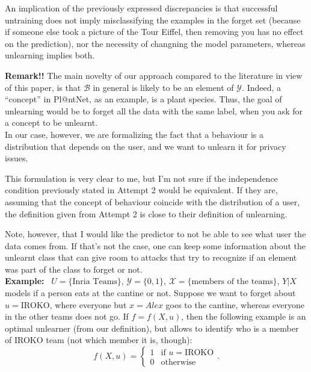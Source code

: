 An implication of the previously expressed discrepancies is that successful untraining does not imply misclassifying the examples in the forget set (be\-cause if someone else took a picture of the Tour Eiffel, then removing you has no effect on the prediction), nor the necessity of changning the model parameters, whereas unlearning implies both.

{\color{RoyalBlue}
\textbf{Remark!!} The main novelty of our approach compared to the literature in view of this paper, is that $\mathcal{B}$ in general is likely to be an element of $\mathcal{Y}$.
Indeed, a ``concept'' in Pl@ntNet, as an example, is a plant species. Thus, the goal of unlearning would be to forget all the data with the same label, when you ask for a concept to be unlearnt.\\
In our case, however, we are formalizing the fact that a behaviour is a distribution that depends on the user, and we want to unlearn it for privacy issues.
\vspace{0.2cm}

\noindent
This formulation is very clear to me, but I'm not sure if the independence condition previously stated in Attempt 2 would be equivalent.
If they are, assuming that the concept of behaviour coincide with the distribution of a user, the definition given from Attempt 2 is close to their definition of un\-learning.

Note, however, that I would like the predictor to not be able to see what user the data comes from. 
If that's not the case, one can keep some information about the unlearnt class that can give room to attacks that try to recognize if an element was part of the class to forget or not.\\
\textbf{Example:}~ $U=\{\text{Inria Teams}\}$, $\mathcal{Y}=\{0,1\}$, $\mathcal{X}=\{\text{members of the teams}\}$, $Y|X$ models if a person eats at the cantine or not.
Suppose we want to forget about $u=\text{IROKO}$, where everyone but $x=Alex$ goes to the cantine, whereas everyone in the other teams does not go. 
If $f=f(X,u)$, then the following example is an optimal unlearner (from our definition), but allows to identify who is a member of IROKO team (not which member it is, though):
\begin{equation*}
  f(X,u)=
  \begin{cases}
    1 & \text{if } u=\text{IROKO}\\
    0 & \text{otherwise}
  \end{cases}.
\end{equation*}

}
